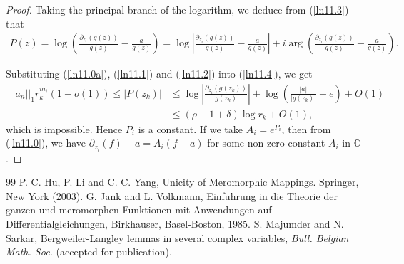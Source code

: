 \documentclass[10pt,a4paper]{amsart}
\begin{document}
\begin{proof}
Taking the principal branch of the logarithm, we deduce from (\ref{ln11.3}) that
\begin{align}\label{ln11.4}
P(z)=\log \left( \frac{\partial_{z_i}(g(z))}{g(z)} - \frac{a}{g(z)} \right)
=\log \left| \frac{\partial_{z_i}(g(z))}{g(z)}-\frac{a}{g(z)}\right|+ i\arg \left(\frac{\partial_{z_i}(g(z))}{g(z)}-\frac{a}{g(z)}\right).
\end{align}

Substituting (\ref{ln11.0a}), (\ref{ln11.1}) and (\ref{ln11.2}) into (\ref{ln11.4}), we get
\begin{align*} ||a_n||_1 r_k^{m_i}(1 - o(1))\leq |P(z_k)|&\leq \log \left|\frac{\partial_{z_i}(g(z_k))}{g(z_k)}\right|+\log \left(\frac{|a|}{|g(z_k)|}+e\right)+O(1)\\&\leq (\rho-1+\delta)\log r_k+O(1),
\end{align*}
which is impossible. Hence $P_i$ is a constant. If we take $A_i=e^{P_i}$, then from (\ref{ln11.0}), we have $\partial_{z_i}(f)-a=A_i(f-a)$ for some non-zero constant $A_i$ in $\mathbb{C}$.
\end{proof}

\begin{thebibliography}{99}
 {\sc P. C. Hu}, {\sc P. Li} and {\sc C. C. Yang}, Unicity of Meromorphic Mappings. Springer, New York (2003).
 {\sc G. Jank} and {\sc L. Volkmann}, Einfuhrung in die Theorie der ganzen und meromorphen Funktionen mit Anwendungen auf Differentialgleichungen, Birkhauser, Basel-Boston, 1985.
 {\sc S. Majumder} and {\sc N. Sarkar}, Bergweiler-Langley lemmas in several complex variables, \textit{Bull. Belgian Math. Soc.} (accepted for publication).
\end{thebibliography}
\end{document}

